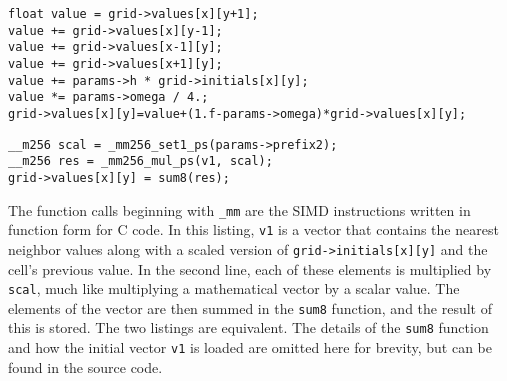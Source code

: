 \vspace{5mm}

\begin{minipage}{\linewidth}
\begin{lstlisting}[frame=single,label=lst:normal,caption={Iteration code (simplified) for a single cell. Also notice that this code uses structure-of-arrays data layout.}]
float value = grid->values[x][y+1];
value += grid->values[x][y-1];
value += grid->values[x-1][y];
value += grid->values[x+1][y];
value += params->h * grid->initials[x][y];
value *= params->omega / 4.;
grid->values[x][y]=value+(1.f-params->omega)*grid->values[x][y];
\end{lstlisting}
\end{minipage}

\begin{minipage}{\linewidth}
\begin{lstlisting}[frame=single,label=lst:simd-normal,caption={SIMD version of iteration code for a single cell. The loading of the initial vector is not shown for simplicity.}]
__m256 scal = _mm256_set1_ps(params->prefix2);
__m256 res = _mm256_mul_ps(v1, scal);
grid->values[x][y] = sum8(res);
\end{lstlisting}
\end{minipage}

The function calls beginning with \texttt{\_mm} are the SIMD instructions written in function form for C code. In this listing, \texttt{v1} is a vector that contains
the nearest neighbor values along with a scaled version of \texttt{grid->initials[x][y]} and the cell's previous value. In the second line, each of these elements is
multiplied by \texttt{scal}, much like multiplying a mathematical vector by a scalar value. The elements of the vector are then summed in the \texttt{sum8} function,
and the result of this is stored. The two listings are equivalent. The details of the \texttt{sum8} function and how the initial vector \texttt{v1} is loaded are
omitted here for brevity, but can be found in the source code.

